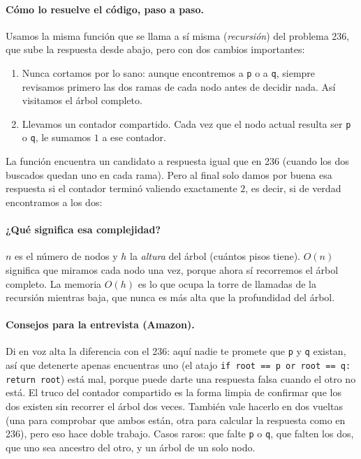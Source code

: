 \paragraph{Cómo lo resuelve el código, paso a paso.} Usamos la misma función que
se llama a sí misma (\emph{recursión}) del problema 236, que sube la respuesta
desde abajo, pero con dos cambios importantes:
\begin{enumerate}
  \item Nunca cortamos por lo sano: aunque encontremos a \texttt{p} o a
        \texttt{q}, siempre revisamos primero las dos ramas de cada nodo antes
        de decidir nada. Así visitamos el árbol completo.
  \item Llevamos un contador compartido. Cada vez que el nodo actual resulta ser
        \texttt{p} o \texttt{q}, le sumamos $1$ a ese contador.
\end{enumerate}
La función encuentra un candidato a respuesta igual que en 236 (cuando los dos
buscados quedan uno en cada rama). Pero al final solo damos por buena esa
respuesta si el contador terminó valiendo exactamente $2$, es decir, si de
verdad encontramos a los dos:




\paragraph{¿Qué significa esa complejidad?} $n$ es el número de nodos y $h$ la
\emph{altura} del árbol (cuántos pisos tiene). $O(n)$ significa que miramos cada
nodo una vez, porque ahora sí recorremos el árbol completo. La memoria $O(h)$ es
lo que ocupa la torre de llamadas de la recursión mientras baja, que nunca es
más alta que la profundidad del árbol.

\paragraph{Consejos para la entrevista (Amazon).} Di en voz alta la diferencia
con el 236: aquí nadie te promete que \texttt{p} y \texttt{q} existan, así que
detenerte apenas encuentras uno (el atajo \texttt{if root == p or root == q:
return root}) está mal, porque puede darte una respuesta falsa cuando el otro no
está. El truco del contador compartido es la forma limpia de confirmar que los
dos existen sin recorrer el árbol dos veces. También vale hacerlo en dos vueltas
(una para comprobar que ambos están, otra para calcular la respuesta como en
236), pero eso hace doble trabajo. Casos raros: que falte \texttt{p} o
\texttt{q}, que falten los dos, que uno sea ancestro del otro, y un árbol de un
solo nodo.
